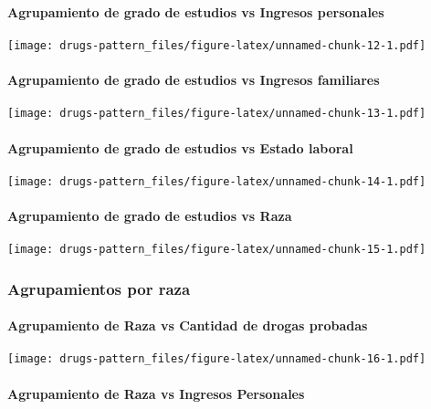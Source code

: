 \documentclass[]{article}
\let\oldparagraph\paragraph
\renewcommand{\paragraph}[1]{\oldparagraph{#1}\mbox{}}
\begin{document}
\paragraph{Agrupamiento de grado de estudios vs Ingresos
personales}\label{agrupamiento-de-grado-de-estudios-vs-ingresos-personales}

\texttt{[image: drugs-pattern\_files/figure-latex/unnamed-chunk-12-1.pdf]}

\paragraph{Agrupamiento de grado de estudios vs Ingresos
familiares}\label{agrupamiento-de-grado-de-estudios-vs-ingresos-familiares}

\texttt{[image: drugs-pattern\_files/figure-latex/unnamed-chunk-13-1.pdf]}

\paragraph{Agrupamiento de grado de estudios vs Estado
laboral}\label{agrupamiento-de-grado-de-estudios-vs-estado-laboral}

\texttt{[image: drugs-pattern\_files/figure-latex/unnamed-chunk-14-1.pdf]}

\paragraph{Agrupamiento de grado de estudios vs
Raza}\label{agrupamiento-de-grado-de-estudios-vs-raza}

\texttt{[image: drugs-pattern\_files/figure-latex/unnamed-chunk-15-1.pdf]}

\subsubsection{Agrupamientos por raza}\label{agrupamientos-por-raza}

\paragraph{Agrupamiento de Raza vs Cantidad de drogas
probadas}\label{agrupamiento-de-raza-vs-cantidad-de-drogas-probadas}

\texttt{[image: drugs-pattern\_files/figure-latex/unnamed-chunk-16-1.pdf]}

\paragraph{Agrupamiento de Raza vs Ingresos
Personales}\label{agrupamiento-de-raza-vs-ingresos-personales}
\end{document}
